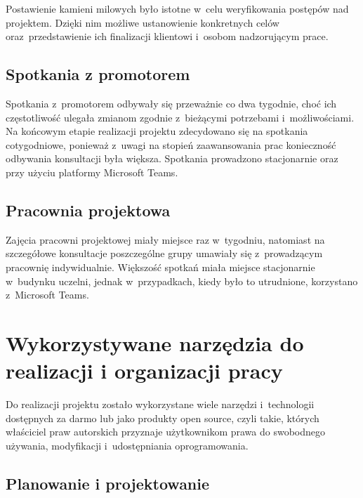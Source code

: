 Postawienie kamieni milowych było istotne w~celu weryfikowania postępów
nad projektem. Dzięki nim możliwe ustanowienie konkretnych celów oraz~przedstawienie
ich finalizacji klientowi i~osobom nadzorującym prace.


\subsection{Spotkania z promotorem}
Spotkania z~promotorem odbywały się przeważnie co dwa tygodnie, choć ich częstotliwość
ulegała zmianom zgodnie z~bieżącymi potrzebami i~możliwościami. Na końcowym etapie realizacji projektu zdecydowano
się na spotkania cotygodniowe, ponieważ z~uwagi na stopień zaawansowania prac konieczność odbywania
konsultacji była większa. Spotkania prowadzono stacjonarnie oraz przy użyciu platformy Microsoft Teams.

\subsection{Pracownia projektowa}
Zajęcia pracowni projektowej miały miejsce raz w~tygodniu, natomiast na szczegółowe konsultacje
poszczególne grupy umawiały się z~prowadzącym pracownię indywidualnie. Większość spotkań miała
miejsce stacjonarnie w~budynku uczelni, jednak w~przypadkach, kiedy było to utrudnione, korzystano
z~Microsoft Teams.



\section{Wykorzystywane narzędzia do realizacji i organizacji pracy}

Do realizacji projektu zostało wykorzystane wiele narzędzi i~technologii
dostępnych za darmo lub jako produkty open source, czyli takie,
których właściciel praw autorskich przyznaje użytkownikom prawa
do swobodnego używania, modyfikacji i~udostępniania oprogramowania.


\subsection{Planowanie i projektowanie}

